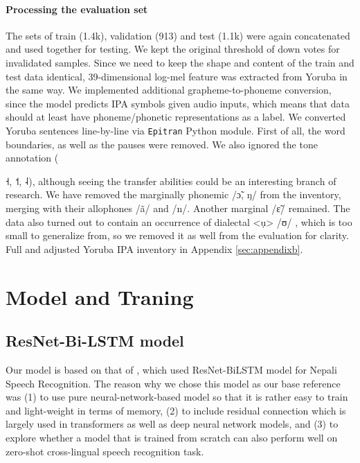 \documentclass[11pt]{article}
\newcommand{\ipa}[1]{{\ipafont #1}}
\begin{document}
\paragraph{Processing the evaluation set} The sets of train (1.4k), validation (913) and test (1.1k) were again concatenated and used together for testing. We kept the original threshold of down votes for invalidated samples. Since we need to keep the shape and content of the train and test data identical, 39-dimensional log-mel feature was extracted from Yoruba in the same way. 
We implemented additional grapheme-to-phoneme conversion, since the model predicts IPA symbols given audio inputs, which means that data should at least have phoneme/phonetic representations as a label. We converted Yoruba sentences line-by-line via \texttt{Epitran} Python module. First of all, the word boundaries, as well as the pauses were removed. We also ignored the tone annotation ({\ipa{˧}, \ipa{˦}, \ipa{˨}), although seeing the transfer abilities could be an interesting branch of research. We have removed the marginally phonemic \ipa{/ɔ̃}, \ipa{ŋ/} from the inventory, merging with their allophones \ipa{/ã/} and \ipa{/n/}. \cite{Przezdziecki2005} Another marginal \ipa{/ɛ̃/} remained. The data also turned out to contain an occurrence of dialectal \ipa{<ụ> /ʊ/} \citet{AllenPulleyblankAjiboye2013}, which is too small to generalize from, so we removed it as well from the evaluation for clarity. Full and adjusted Yoruba IPA inventory in Appendix \ref{sec:appendixb}. 

\section{Model and Traning}
\subsection{ResNet-Bi-LSTM model}
Our model is based on that of \cite{dhakal2022automatic}, which used ResNet-BiLSTM model for Nepali Speech Recognition. The reason why we chose this model as our base reference was (1) to use pure neural-network-based model so that it is rather easy to train and light-weight in terms of memory, (2) to include residual connection which is largely used in transformers as well as deep neural network models, and (3) to explore whether a model that is trained from scratch can also perform well on zero-shot cross-lingual speech recognition task.

}
\end{document}
